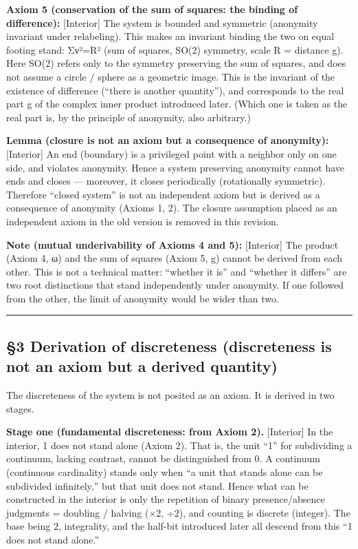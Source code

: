 \documentclass[11pt]{ltjsarticle}
\begin{document}
\textbf{Axiom 5 (conservation of the sum of squares: the binding of
difference):} {[}Interior{]} The system is bounded and symmetric
(anonymity invariant under relabeling). This makes an invariant binding
the two on equal footing stand: Σν²=R² (sum of squares, SO(2) symmetry,
scale R = distance g). Here SO(2) refers only to the symmetry preserving
the sum of squares, and does not assume a circle / sphere as a geometric
image. This is the invariant of the existence of difference (``there is
another quantity''), and corresponds to the real part g of the complex
inner product introduced later. (Which one is taken as the real part is,
by the principle of anonymity, also arbitrary.)

\textbf{Lemma (closure is not an axiom but a consequence of anonymity):}
{[}Interior{]} An end (boundary) is a privileged point with a neighbor
only on one side, and violates anonymity. Hence a system preserving
anonymity cannot have ends and closes --- moreover, it closes
periodically (rotationally symmetric). Therefore ``closed system'' is
not an independent axiom but is derived as a consequence of anonymity
(Axioms 1, 2). The closure assumption placed as an independent axiom in
the old version is removed in this revision.

\textbf{Note (mutual underivability of Axioms 4 and 5):} {[}Interior{]}
The product (Axiom 4, ω) and the sum of squares (Axiom 5, g) cannot be
derived from each other. This is not a technical matter: ``whether it
is'' and ``whether it differs'' are two root distinctions that stand
independently under anonymity. If one followed from the other, the limit
of anonymity would be wider than two.

\begin{center}\rule{0.5\linewidth}{0.5pt}\end{center}

\subsection{§3 Derivation of discreteness (discreteness is not an axiom
but a derived
quantity)}\label{derivation-of-discreteness-discreteness-is-not-an-axiom-but-a-derived-quantity}

The discreteness of the system is not posited as an axiom. It is derived
in two stages.

\textbf{Stage one (fundamental discreteness: from Axiom 2).}
{[}Interior{]} In the interior, 1 does not stand alone (Axiom 2). That
is, the unit ``1'' for subdividing a continuum, lacking contrast, cannot
be distinguished from 0. A continuum (continuous cardinality) stands
only when ``a unit that stands alone can be subdivided infinitely,'' but
that unit does not stand. Hence what can be constructed in the interior
is only the repetition of binary presence/absence judgments = doubling /
halving (×2, ÷2), and counting is discrete (integer). The base being 2,
integrality, and the half-bit introduced later all descend from this ``1
does not stand alone.''
\end{document}
